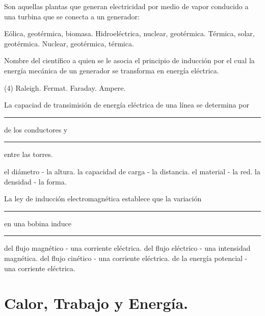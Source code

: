 \documentclass[12pt, letter]{exam}
\begin{document}
\begin{questions}
    \newpage

    \question Son aquellas plantas que generan electricidad por medio de vapor conducido a una turbina que se conecta a un generador:
    \begin{tasks}
        \task Eólica, geotérmica, biomasa.
        \task Hidroeléctrica, nuclear, geotérmica.
        \task Térmica, solar, geotérmica.
        \task Nuclear, geotérmica, térmica.
    \end{tasks}
    \question Nombre del científico a quien se le asocia el principio de inducción por el cual la energía mecánica de un generador se transforma en energía eléctrica.
    \begin{tasks}(4)
        \task Raleigh.
        \task Fermat.
        \task Faraday.
        \task Ampere.
    \end{tasks}
    \question La capaciad de transimisión de energía eléctrica de una línea se determina por \rule{2cm}{0.1mm} de los conductores y \rule{2cm}{0.1mm} entre las torres.
    \begin{tasks}
        \task el diámetro - la altura.
        \task la capacidad de carga - la distancia.
        \task el material - la red.
        \task la densidad - la forma.
    \end{tasks}
    \question La ley de inducción electromagnética establece que la variación \rule{2cm}{0.1mm}  en una bobina induce \rule{2cm}{0.1mm}
    \begin{tasks}
        \task del flujo magnético - una corriente eléctrica.
        \task del flujo eléctrico - una intensidad magnética.
        \task del flujo cinético - una corriente eléctrica.
        \task de la energía potencial - una corriente eléctrica.
    \end{tasks}
    
    \section{Calor, Trabajo y Energía.}
    

\end{questions}
\end{document}
